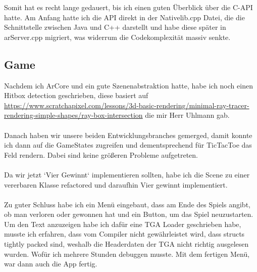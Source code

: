 Somit hat es recht lange gedauert, bis ich einen guten Überblick über die C-API
hatte. Am Anfang hatte ich die API direkt in der Nativelib.cpp Datei, die die
Schnittstelle zwischen Java und C++ darstellt und habe diese später in arServer.cpp
migriert, was widerrum die Codekomplexität massiv senkte.

\subsection{Game}
Nachdem ich ArCore und ein gute Szenenabstraktion hatte, habe ich noch einen Hitbox detection geschrieben, diese basiert auf \url{https://www.scratchapixel.com/lessons/3d-basic-rendering/minimal-ray-tracer-rendering-simple-shapes/ray-box-intersection}
die mir Herr Uhlmann gab.\\ \\

Danach haben wir unsere beiden Entwicklungsbranches gemerged, damit konnte ich
dann auf die GameStates zugreifen und dementsprechend für TicTacToe das Feld rendern.
Dabei sind keine größeren Probleme aufgetreten. \\ \\

Da wir jetzt `Vier Gewinnt` implementieren sollten, habe ich die Scene zu einer vererbaren Klasse refactored und daraufhin Vier gewinnt implementiert. \\ \\

Zu guter Schluss habe ich ein Menü eingebaut, dass am Ende des Spiels angibt, ob man
verloren oder gewonnen hat und ein Button, um das Spiel neuzustarten.
Um den Text anzuzeigen habe ich dafür eine TGA Loader geschrieben habe, musste ich
erfahren, dass vom Compiler nicht gewährleistet wird, dass structs tightly packed
sind, weshalb die Headerdaten der TGA nicht richtig ausgelesen wurden. Wofür ich mehrere Stunden debuggen musste. Mit dem fertigen Menü, war dann auch die App fertig.
